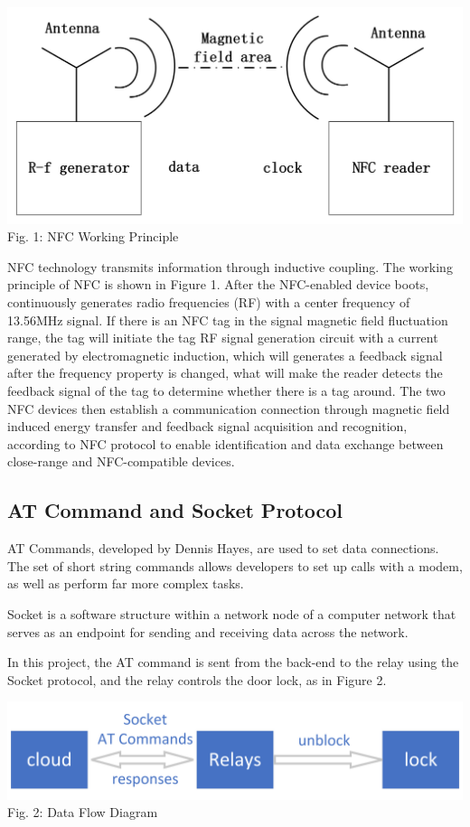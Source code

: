 \documentclass[11pt, a4paper]{article}
\begin{document}
\begin{center}
    \includegraphics[scale=0.4]{pic1.png}
    \\
    Fig. 1: NFC Working Principle
\end{center}

NFC technology transmits information through inductive coupling. The working principle of NFC is shown in Figure 1. After the NFC-enabled device boots, continuously generates radio frequencies (RF) with a center frequency of 13.56MHz signal. If there is an NFC tag in the signal magnetic field fluctuation range, the tag will initiate the tag RF signal generation circuit with a current generated by electromagnetic induction, which will generates a feedback signal after the frequency property is changed, what will make the   reader detects the feedback signal of the tag to determine whether there is a tag around. The two NFC devices then establish a communication connection through magnetic field induced energy transfer and feedback signal acquisition and recognition, according to NFC protocol to enable identification and data exchange between close-range and NFC-compatible devices.

\subsection{AT Command and Socket Protocol}
AT Commands, developed by Dennis Hayes, are used to set data connections. The set of short string commands allows developers to set up calls with a modem, as well as perform far more complex tasks.

Socket is a software structure within a network node of a computer network that serves as an endpoint for sending and receiving data across the network.

In this project, the AT command is sent from the back-end to the relay using the Socket protocol, and the relay controls the door lock, as in Figure 2.
\begin{center}
    \includegraphics[scale=0.2]{pic2.png}
    \\
    Fig. 2: Data Flow Diagram
\end{center}
\end{document}
